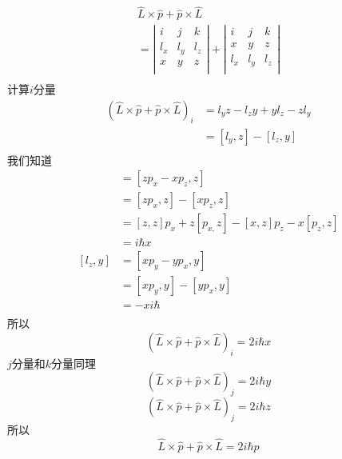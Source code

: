 $$
\begin{array}{l}
	\hat{L}\times \hat{p}+\hat{p}\times \hat{L}\\
	=\left| \begin{matrix}
	i&		j&		k\\
	l_x&		l_y&		l_z\\
	x&		y&		z\\
\end{matrix} \right|+\left| \begin{matrix}
	i&		j&		k\\
	x&		y&		z\\
	l_x&		l_y&		l_z\\
\end{matrix} \right|\\
\end{array}
$$
计算$i$分量
\begin{align}
\left(\hat{L}\times \hat{p}+\hat{p}\times \hat{L}\right)_i&= l_yz-l_zy+yl_z-zl_y\\
&=\left[ l_y,z \right] -\left[ l_z,y \right]\\
\end{align}
我们知道
\begin{align}
	[l_y,z]&=\left[ zp_x-xp_z,z \right]\\
	&=\left[ zp_x,z \right] -\left[ xp_z,z \right]\\
	&=[z,z]p_x+z\left[ p_{x,}z \right] -[x,z]p_z-x\left[ p_z,z \right]\\
	&=i\hbar x\\
	[l_z,y]&=\left[ xp_y-yp_x,y \right]\\
	&=\left[ xp_y,y \right] -[yp_x,y]\\
	&=-xi\hbar\\
\end{align}
所以
$$
\left(\hat{L}\times \hat{p}+\hat{p}\times \hat{L}\right)_i=2i\hbar x
$$
$j$分量和$k$分量同理
$$
\left(\hat{L}\times \hat{p}+\hat{p}\times \hat{L}\right)_j=2i\hbar y
$$$$
\left(\hat{L}\times \hat{p}+\hat{p}\times \hat{L}\right)_j=2i\hbar z
$$
所以
$$
\hat{L}\times \hat{p}+\hat{p}\times \hat{L}=2i\hbar \hat{p}
$$
